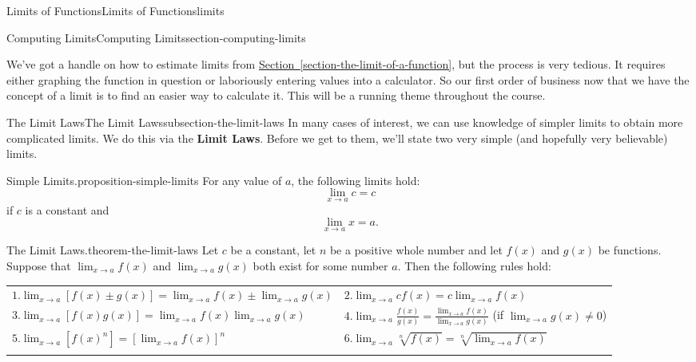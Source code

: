\documentclass[oneside,10pt,]{book}
\newcommand{\terminology}[1]{\textbf{#1}}
\numberwithin{equation}{section}
\newcommand{\hrulethick} {\noalign{\hrule height 0.11em}}
\begin{document}
\begin{chapterptx}{Limits of Functions}{}{Limits of Functions}{}{}{limits}
\begin{sectionptx}{Computing Limits}{}{Computing Limits}{}{}{section-computing-limits}
\begin{introduction}{}%
\hypertarget{p-19}{}%
We've got a handle on how to estimate limits from \hyperref[section-the-limit-of-a-function]{Section~\ref{section-the-limit-of-a-function}}, but the process is very tedious. It requires either graphing the function in question or laboriously entering values into a calculator. So our first order of business now that we have the concept of a limit is to find an easier way to calculate it. This will be a running theme throughout the course.%
\end{introduction}%
%
%
\typeout{************************************************}
\typeout{************************************************}
%
\begin{subsectionptx}{The Limit Laws}{}{The Limit Laws}{}{}{subsection-the-limit-laws}
\hypertarget{p-20}{}%
In many cases of interest, we can use knowledge of simpler limits to obtain more complicated limits. We do this via the \terminology{Limit Laws}. Before we get to them, we'll state two very simple (and hopefully very believable) limits.%
\begin{proposition}{Simple Limits.}{}{proposition-simple-limits}%
\hypertarget{p-21}{}%
For any value of \(a\), the following limits hold:%
\begin{equation*}
\lim_{x\to a}c = c
\end{equation*}
if \(c\) is a constant and%
\begin{equation*}
\lim_{x\to a}x = a.
\end{equation*}
%
\end{proposition}
\begin{theorem}{The Limit Laws.}{}{theorem-the-limit-laws}%
\hypertarget{p-22}{}%
Let \(c\) be a constant, let \(n\) be a positive whole number and let \(f(x)\) and \(g(x)\) be functions. Suppose that \(\lim_{x\to a}f(x)\) and \(\lim_{x\to a}g(x)\) both exist for some number \(a\). Then the following rules hold:%
\begin{table}
\centering
\begin{tabular}{ll}\hrulethick
\(1. \lim_{x\to a}[f(x)\pm g(x)] = \lim_{x\to a}f(x)\pm \lim_{x\to a}g(x)\)&\(2. \lim_{x\to a}cf(x) = c\lim_{x\to a}f(x)\)\tabularnewline[0pt]
\(3. \lim_{x\to a}[f(x)g(x)] = \lim_{x\to a}f(x)\lim_{x\to a}g(x)\)&\(4. \lim_{x\to a}\frac{f(x)}{g(x)} = \frac{\lim_{x\to a}f(x)}{\lim_{x\to a}g(x)}\) (if \(\lim_{x\to a}g(x)\neq 0\))\tabularnewline[0pt]
\(5. \lim_{x\to a}[f(x)^{n}] = [\lim_{x\to a}f(x)]^{n}\)&\(6. \lim_{x\to a}\sqrt[n]{f(x)} = \sqrt[n]{\lim_{x\to a}f(x)}\)\tabularnewline\hrulethick

\end{tabular}
\end{table}
\end{theorem}
\end{subsectionptx}
\end{sectionptx}
\end{chapterptx}
\end{document}
